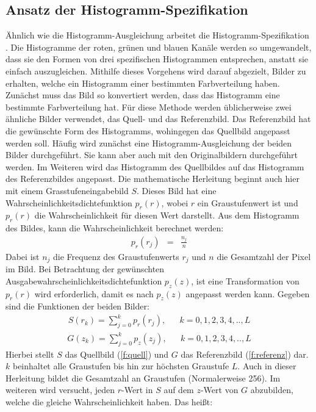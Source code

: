   \subsection{Ansatz der Histogramm-Spezifikation}\label{s.hs}
Ähnlich wie die Histogramm-Ausgleichung arbeitet die Histogramm-Spezifikation\\ \cite{goatman2003colour}. Die Histogramme der roten, grünen und blauen Kanäle werden so umgewandelt, dass sie den Formen von drei spezifischen Histogrammen entsprechen, anstatt sie einfach auszugleichen. Mithilfe dieses Vorgehens wird darauf abgezielt, Bilder zu erhalten, welche ein Histogramm einer bestimmten Farbverteilung haben. Zunächst muss das Bild so konvertiert werden, dass das Histogramm eine bestimmte Farbverteilung hat. Für diese Methode werden üblicherweise zwei ähnliche Bilder verwendet, das Quell- und das Referenzbild. Das Referenzbild hat die gewünschte Form des Histogramms, wohingegen das Quellbild angepasst werden soll. Häufig wird zunächst eine Histogramm-Ausgleichung der beiden Bilder durchgeführt. Sie kann aber auch mit den Originalbildern durchgeführt werden. Im Weiteren wird das Histogramm des Quellbildes auf das Histogramm des Referenzbildes angepasst. Die mathematische Herleitung beginnt auch hier mit einem Grasstufeneingabebild $S$. 
Dieses Bild hat eine Wahrscheinlichkeitsdichtefunktion $p_{r}(r)$, wobei $r$ ein Graustufenwert ist und $p_{r}(r)$ die Wahrscheinlichkeit für diesen Wert darstellt. Aus dem Histogramm des Bildes, kann die Wahrscheinlichkeit berechnet werden:
\begin{eqnarray} p_{r}(r_{j})&=&\frac{n_{j}}{n} \end{eqnarray}
Dabei ist $n_{j}$ die Frequenz des Graustufenwerts $r_{j}$ und $n$ die Gesamtzahl der Pixel im Bild. Bei Betrachtung der gewünschten Ausgabewahrscheinlichkeitsdichtefunktion $p_{z}(z)$, ist eine Transformation von $p_{r}(r)$ wird erforderlich, damit es nach $p_{z}(z)$ angepasst werden kann. Gegeben sind die Funktionen der beiden Bilder: 
\begin{align} \label{f:quell} S(r_{k})=\sum_{j=0}^k p_{r}(r_{j}) ,& &k=0,1,2,3,4,..,L\end{align}
\begin{align} \label{f:referenz} G(z_{k})=\sum_{j=0}^k p_{z}(z_{j}) ,& &k=0,1,2,3,4,.., L \end{align}
Hierbei stellt $S$ das Quellbild (\ref{f:quell}) und $G$ das Referenzbild (\ref{f:referenz}) dar. $k$ beinhaltet alle Graustufen bis hin zur höchsten Graustufe $L$.   
Auch in dieser Herleitung bildet die Gesamtzahl an Graustufen (Normalerweise 256). Im weiteren wird versucht, jeden $r$-Wert in $S$ auf dem $z$-Wert von $G$ abzubilden, welche die gleiche Wahrscheinlichkeit haben. Das heißt:
